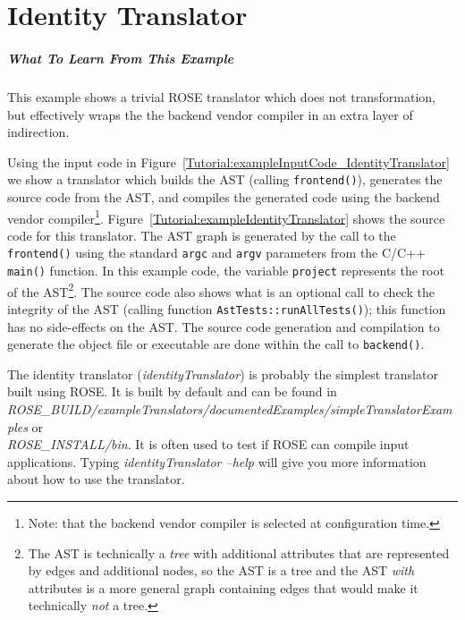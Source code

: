 \chapter{Identity Translator}

\paragraph{What To Learn From This Example}
This example shows a trivial ROSE translator which does not transformation,
but effectively wraps the the backend vendor compiler in an extra layer of 
indirection.
\vspace{0.25in}

  Using the input code in Figure~\ref{Tutorial:exampleInputCode_IdentityTranslator}
we show a translator which builds the AST (calling {\tt frontend()}), generates 
the source code from the AST, and compiles the generated code using the backend vendor 
compiler\footnote{Note: that the backend vendor compiler is selected at configuration time.}.
Figure~\ref{Tutorial:exampleIdentityTranslator} shows the source code for this
translator.
The AST graph is generated by the call to the {\tt frontend()} using the
standard {\tt argc} and {\tt argv} parameters from the C/C++ {\tt main()} function.
In this example code, the variable {\tt project} represents the root of the AST\footnote{
The AST is technically a {\em tree} with additional attributes that are represented by 
edges and additional nodes, so the AST is a tree and the AST {\em with} attributes is
a more general graph containing edges that would make it technically {\em not} a tree.}.
The source code also shows what is an optional call to check the integrity of
the AST (calling function {\tt AstTests::runAllTests()}); this function has no 
side-effects on the AST.
The source code generation and compilation to generate the object file or executable are
done within the call to {\tt backend()}.

The identity translator (\textit{identityTranslator}) is probably the
simplest translator built using ROSE. It is built by default and can be found in \\
\textit{ROSE\_BUILD/exampleTranslators/documentedExamples/simpleTranslatorExamples} 
or \\
\textit{ROSE\_INSTALL/bin}.  It is often used to test if
ROSE can compile input applications.
Typing \textit{identityTranslator --help} will give you more information
about how to use the translator.

